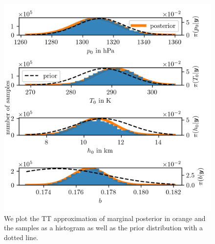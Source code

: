 \begin{figure}[ht!]
	\centering
	\includegraphics{PHdPTPost0.png}
	\caption[Histograms and TT approximation of posterior distribution as well as hyper-prior distribution.]{We plot the TT approximation of marginal posterior in orange and the samples as a histogram as well as the prior distribution with a dotted line.}
	\label{fig:PostHistTT0}
\end{figure}
